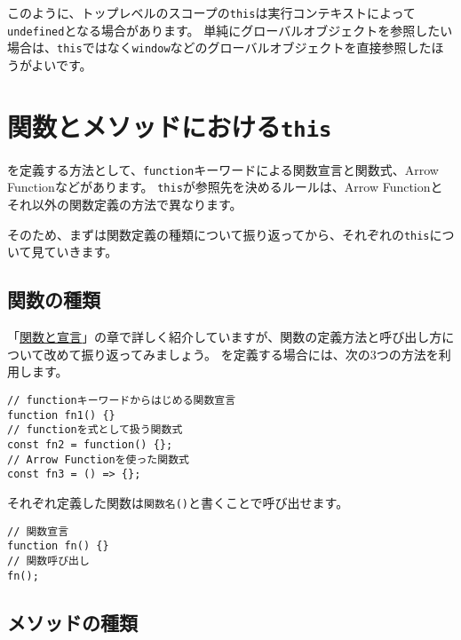 このように、トップレベルのスコープの\texttt{this}は実行コンテキストによって\texttt{undefined}となる場合があります。
単純にグローバルオブジェクトを参照したい場合は、\texttt{this}ではなく\texttt{window}などのグローバルオブジェクトを直接参照したほうがよいです。

\hypertarget{function-and-method-this}{%
\section{\texorpdfstring{関数とメソッドにおける\texttt{this}}{関数とメソッドにおけるthis}}\label{function-and-method-this}}

\textbf{}を定義する方法として、\texttt{function}キーワードによる関数宣言と関数式、Arrow
Functionなどがあります。
\texttt{this}が参照先を決めるルールは、Arrow
Functionとそれ以外の関数定義の方法で異なります。

そのため、まずは関数定義の種類について振り返ってから、それぞれの\texttt{this}について見ていきます。

\hypertarget{type-of-function}{%
\subsection{関数の種類}\label{type-of-function}}

「\hyperlink{function-and-declaration}{関数と宣言}」の章で詳しく紹介していますが、関数の定義方法と呼び出し方について改めて振り返ってみましょう。
\textbf{}を定義する場合には、次の3つの方法を利用します。

\begin{lstlisting}
// functionキーワードからはじめる関数宣言
function fn1() {}
// functionを式として扱う関数式
const fn2 = function() {};
// Arrow Functionを使った関数式
const fn3 = () => {};
\end{lstlisting}

それぞれ定義した関数は\texttt{関数名()}と書くことで呼び出せます。

\begin{lstlisting}
// 関数宣言
function fn() {}
// 関数呼び出し
fn();
\end{lstlisting}

\hypertarget{type-of-method}{%
\subsection{メソッドの種類}\label{type-of-method}}

